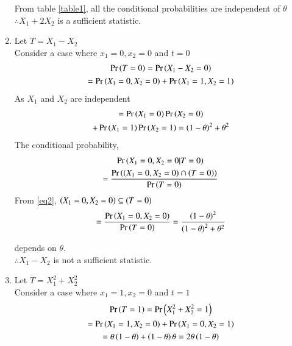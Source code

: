 \documentclass[journal,12pt,twocolumn]{IEEEtran}
\begin{document}
\begin{enumerate}
    From table \ref{table1}, all the conditional probabilities are independent of $\theta$\\ $\therefore X_1+2X_2$ is a sufficient statistic.
    
    
    \item Let $T=X_1-X_2$\\
    Consider a case where $x_1=0, x_2=0$ and $t=0$
    \begin{multline}
        \label{eq2}\Pr\left(T=0\right)=\Pr\left(X_1-X_2=0\right)\\=\Pr\left(X_1=0,X_2=0\right)+\Pr\left(X_1=1,X_2=1\right)
    \end{multline}
    As $X_1$ and $X_2$ are independent
    \begin{multline}
        =\Pr\left(X_1=0\right)\Pr\left(X_2=0\right)\\+\Pr\left(X_1=1\right)\Pr\left(X_2=1\right)=\left(1-\theta\right)^2 + \theta^2
    \end{multline}
    The conditional probability,
    \begin{multline}
        \Pr\left(X_1=0,X_2=0 | T=0\right)\\
        =\frac{\Pr\left(\left(X_1=0,X_2=0\right)\cap\left(T=0\right)\right)}{\Pr\left(T=0\right)}
    \end{multline}
    From \eqref{eq2}, $\left(X_1=0,X_2=0\right) \subseteq \left(T=0\right)$
    \begin{multline}
        =\frac{\Pr\left(X_1=0,X_2=0\right)}{\Pr\left(T=0\right)}=\frac{\left(1-\theta\right)^2}{\left(1-\theta\right)^2 + \theta^2}
    \end{multline}
  
    depends on $\theta$. \\
    $\therefore X_1-X_2$ is not a sufficient statistic.
    
    \item Let $T=X_1^2+X_2^2$\\
    Consider a case where $x_1=1, x_2=0$ and $t=1$
    \begin{multline}
        \label{eq3}\Pr\left(T=1\right)=\Pr\left(X_1^2+X_2^2=1\right)\\=\Pr\left(X_1=1,X_2=0\right)+\Pr\left(X_1=0,X_2=1\right)\\=\theta \left(1-\theta\right) + \left(1-\theta\right)\theta  = 2\theta \left(1-\theta\right)
    \end{multline}


\end{enumerate}
\end{document}
